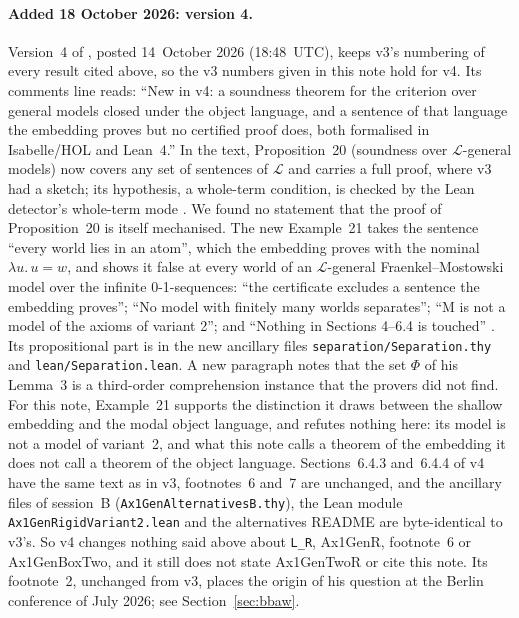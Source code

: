 \documentclass[11pt,a4paper]{article}
\newcommand{\lean}[1]{\texttt{#1}}
\theoremstyle{definition}
\theoremstyle{remark}
\begin{document}
\paragraph{Added 18 October 2026: version 4.}
Version~4 of \cite{benzmuellerPWN2026}, posted 14~October 2026 (18:48~UTC),
keeps v3's numbering of every result cited above, so the v3 numbers given in
this note hold for v4.
Its comments line reads: ``New in v4: a soundness theorem for the criterion
over general models closed under the object language, and a sentence of that
language the embedding proves but no certified proof does, both formalised in
Isabelle/HOL and Lean~4.''
In the text, Proposition~20 (soundness over \(\mathcal{L}\)-general models)
now covers any set of sentences of \(\mathcal{L}\) and carries a full
proof, where v3 had a sketch; its hypothesis, a whole-term condition, is
checked by the Lean detector's whole-term mode \cite[v4,
Sect.~8.3]{benzmuellerPWN2026}.
We found no statement that the proof of Proposition~20 is itself mechanised.
The new Example~21 takes the sentence ``every world lies in an atom'', which
the embedding proves with the nominal \(\lambda u.\,u=w\), and shows it
false at every world of an \(\mathcal{L}\)-general Fraenkel--Mostowski
model over the infinite 0-1-sequences: ``the certificate excludes a sentence
the embedding proves''; ``No model with finitely many worlds separates'';
``M is not a model of the axioms of variant 2''; and ``Nothing in Sections
4--6.4 is touched'' \cite[v4, Sect.~8.3]{benzmuellerPWN2026}.
Its propositional part is in the new ancillary files
\lean{separation/Separation.thy} and \lean{lean/Separation.lean}.
A new paragraph notes that the set \(\Phi\) of his Lemma~3 is a
third-order comprehension instance that the provers did not find.
For this note, Example~21 supports the distinction it draws between the
shallow embedding and the modal object language, and refutes nothing here:
its model is not a model of variant~2, and what this note calls a theorem of
the embedding it does not call a theorem of the object language.
Sections~6.4.3 and~6.4.4 of v4 have the same text as in v3, footnotes~6
and~7 are unchanged, and the ancillary files of session~B
(\lean{Ax1GenAlternativesB.thy}), the Lean module
\lean{Ax1GenRigidVariant2.lean} and the alternatives README are
byte-identical to v3's.
So v4 changes nothing said above about \lean{L\_R}, Ax1GenR, footnote~6
or Ax1GenBoxTwo, and it still does not state Ax1GenTwoR or cite this note.
Its footnote~2, unchanged from v3, places the origin of his question at the
Berlin conference of July 2026; see Section~\ref{sec:bbaw}.
\end{document}
